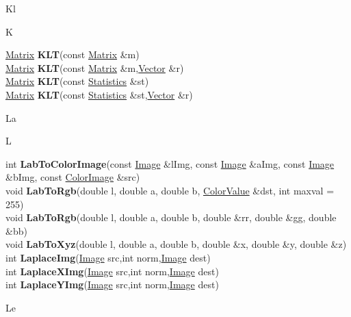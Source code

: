 \documentclass[10pt,titlepage]{article}
\def\functionlistentry#1#2#3#4#5#6{\noindent #1 {\bf #2}(#3) \dotfill #6\\}
\def\letterref#1{}
\def\letterlabel#1{\vspace{0.5cm}\centerline{\Large #1}}
\def\letterlabelend#1{}
\begin{document}
{{\letterlabel{Kl}
\letterlabel{K}
\letterref{A}
\letterref{B}
\letterref{C}
\letterref{D}
\letterref{E}
\letterref{F}
\letterref{G}
\letterref{H}
\letterref{I}
\letterref{K}
\letterref{L}
\letterref{M}
\letterref{N}
\letterref{O}
\letterref{P}
\letterref{Q}
\letterref{R}
\letterref{S}
\letterref{T}
\letterref{U}
\letterref{V}
\letterref{W}
\letterref{X}
\letterref{Y}
\letterref{Z}

\letterref{Kl}
\letterlabelend{Kl}
\functionlistentry{\hyperlink{Matrix}{Matrix}}{KLT}{const \hyperlink{Matrix}{Matrix} \&m}{876}{statistics}{}
\functionlistentry{\hyperlink{Matrix}{Matrix}}{KLT}{const \hyperlink{Matrix}{Matrix} \&m,\hyperlink{Vector}{Vector} \&r}{877}{statistics}{}
\functionlistentry{\hyperlink{Matrix}{Matrix}}{KLT}{const \hyperlink{Statistics}{Statistics} \&st}{878}{statistics}{}
\functionlistentry{\hyperlink{Matrix}{Matrix}}{KLT}{const \hyperlink{Statistics}{Statistics} \&st,\hyperlink{Vector}{Vector} \&r}{879}{statistics}{}

\letterlabel{La}
\letterlabel{L}
\letterref{A}
\letterref{B}
\letterref{C}
\letterref{D}
\letterref{E}
\letterref{F}
\letterref{G}
\letterref{H}
\letterref{I}
\letterref{K}
\letterref{L}
\letterref{M}
\letterref{N}
\letterref{O}
\letterref{P}
\letterref{Q}
\letterref{R}
\letterref{S}
\letterref{T}
\letterref{U}
\letterref{V}
\letterref{W}
\letterref{X}
\letterref{Y}
\letterref{Z}

\letterref{La}
\letterref{Le}
\letterref{Li}
\letterref{Lm}
\letterref{Lo}
\letterref{Ls}
\letterref{Lu}
\letterlabelend{La}
\functionlistentry{int}{LabToColorImage}{const \hyperlink{Image}{Image} \&lImg, const \hyperlink{Image}{Image} \&aImg, const \hyperlink{Image}{Image} \&bImg, const \hyperlink{ColorImage}{ColorImage} \&src}{1110}{processing}{}
\functionlistentry{void}{LabToRgb}{double l, double a, double b, \hyperlink{ColorValue}{ColorValue} \&dst, int maxval = 255}{306}{datastructures}{}
\functionlistentry{void}{LabToRgb}{double l, double a, double b, double \&rr, double \&gg, double \&bb}{316}{datastructures}{}
\functionlistentry{void}{LabToXyz}{double l, double a, double b, double \&x, double \&y, double \&z}{314}{datastructures}{}
\functionlistentry{int}{LaplaceImg}{\hyperlink{Image}{Image} src,int norm,\hyperlink{Image}{Image} dest}{351}{filter}{}
\functionlistentry{int}{LaplaceXImg}{\hyperlink{Image}{Image} src,int norm,\hyperlink{Image}{Image} dest}{349}{filter}{}
\functionlistentry{int}{LaplaceYImg}{\hyperlink{Image}{Image} src,int norm,\hyperlink{Image}{Image} dest}{350}{filter}{}

\letterlabel{Le}
\letterref{A}
\letterref{B}
\letterref{C}
\letterref{D}
\letterref{E}
\letterref{F}
\letterref{G}
\letterref{H}
\letterref{I}
\letterref{K}
\letterref{L}
\letterref{M}
\letterref{N}
\letterref{O}
\letterref{P}
\letterref{Q}
\letterref{R}
\letterref{S}
\letterref{T}
\letterref{U}
\letterref{V}
\letterref{W}
\letterref{X}
\letterref{Y}
\letterref{Z}

}}
\end{document}
